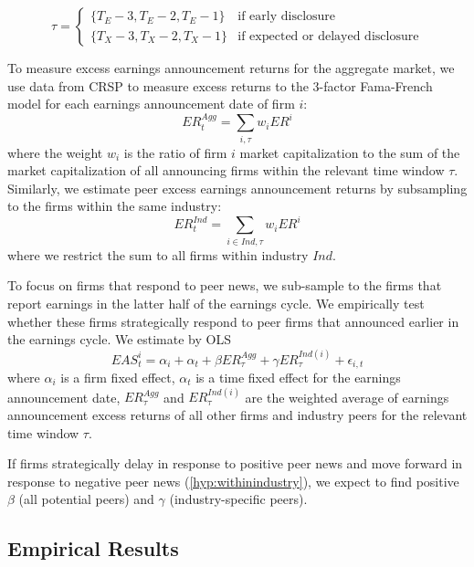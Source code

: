 \documentclass[ecta,nameyear,draft]{econsocart}
\theoremstyle{theorem}
\numberwithin{lemma}{section}
\numberwithin{proposition}{section}
\numberwithin{equation}{section}
\numberwithin{figure}{section}
\begin{document}
\begin{equation}
      \tau=
    \begin{cases}
      \{T_{E}-3,T_{E}-2,T_{E}-1\} & \text{if early disclosure}\\
      \{T_{X}-3,T_{X}-2,T_{X}-1\} & \text{if expected or delayed disclosure}
    \end{cases}     
\end{equation}

To measure excess earnings announcement returns for the aggregate market, we use data from CRSP to measure excess returns to the 3-factor Fama-French model for each earnings announcement date of firm $i$:  
\begin{equation}
    ER^{Agg}_{t}= \sum_{i, \tau} w_{i} ER^{i}
\end{equation}
where the weight $w_i$ is the ratio of firm $i$ market capitalization to the sum of the market capitalization of all announcing firms within the relevant time window $\tau$. Similarly, we estimate peer excess earnings announcement returns by subsampling to the firms within the same industry: 
\begin{equation}
    ER^{Ind}_{t}= \sum_{i\in Ind,\tau} w_{i} ER^{i}
\end{equation}
where we restrict the sum to all firms within industry $Ind$. 

To focus on firms that respond to peer news, we sub-sample to the firms that report earnings in the latter half of the earnings cycle. We empirically test whether these firms strategically respond to peer firms that announced earlier in the earnings cycle. We estimate by OLS
\begin{equation} \label{eq:withinindustry}
    EAS^{i}_{t} = \alpha_{i} +\alpha_{t} + \beta ER^{Agg}_{\tau} + \gamma  ER^{Ind(i)}_{\tau}  + \epsilon_{i,t}
\end{equation}
where $\alpha_{i}$ is a firm fixed effect, $\alpha_{t}$ is a time fixed effect for the earnings announcement date, $ER^{Agg}_{\tau}$ and $ER^{Ind(i)}_{\tau}$ are the weighted average of earnings announcement excess returns of all other firms and industry peers for the relevant time window $\tau$. 

If firms strategically delay in response to positive peer news and move forward in response to negative peer news (\ref{hyp:withinindustry}), we expect to find positive $\beta$ (all potential peers) and $\gamma$ (industry-specific peers). 


\subsection{Empirical Results}\label{ss:empiricalresults}
\end{document}
